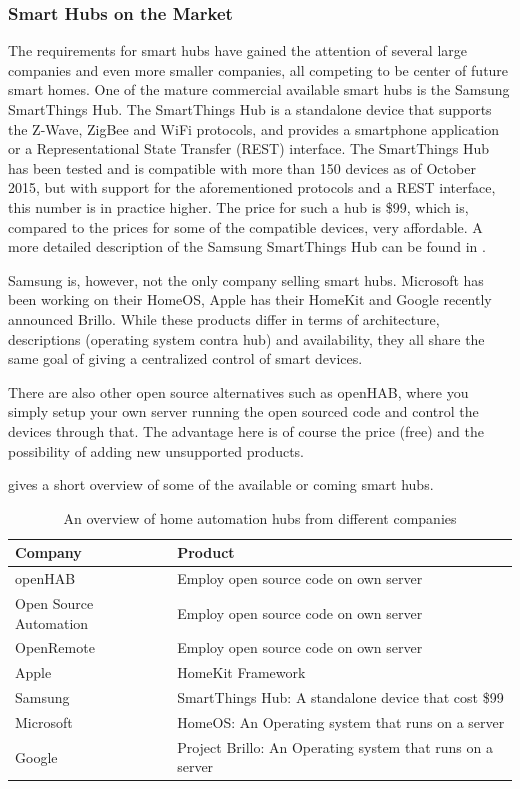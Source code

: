\subsubsection{Smart Hubs on the Market}
The requirements for smart hubs have gained the attention of several large companies and even more smaller companies, 
all competing to be center of future smart homes. 
One of the mature commercial available smart hubs is the Samsung SmartThings Hub\cite{SMARTTHINGS}. 
The SmartThings Hub is a standalone device that supports the Z-Wave, ZigBee and WiFi protocols, 
and provides a smartphone application or a Representational State Transfer (REST) interface. 
The SmartThings Hub has been tested and is compatible with more than 150 devices as of October 2015,
but with support for the aforementioned protocols and a REST interface, this number is in practice higher.  
The price for such a hub is \$99, which is, compared to the prices for some of the compatible devices, very affordable. 
A more detailed description of the Samsung SmartThings Hub can be found in . 

Samsung is, however, not the only company selling smart hubs. 
Microsoft has been working on their HomeOS\cite{HOMEOS}, Apple has their HomeKit\cite{HOMEKIT} and Google recently announced Brillo\cite{BRILLO}. 
While these products differ in terms of architecture, descriptions (operating system contra hub) and availability,
they all share the same goal of giving a centralized control of smart devices. 

There are also other open source alternatives such as openHAB\cite{OPENHAB}, 
where you simply setup your own server running the open sourced code and control the devices through that. 
The advantage here is of course the price (free) and the possibility of adding new unsupported products. 


 gives a short overview of some of the available or coming smart hubs. 
\begin{table}
    \centering
    \begin{tabular}{l l}
        Company                           & Product                              \\\hline
        openHAB\cite{OPENHAB}             & Employ open source code on own server \\
        Open Source Automation\cite{OSA}  & Employ open source code on own server \\
        OpenRemote\cite{OPENREMOTE}       & Employ open source code on own server \\
        Apple\cite{HOMEKIT}               & HomeKit Framework \\
        Samsung\cite{SMARTTHINGS}         & SmartThings Hub: A standalone device that cost \$99 \\
        Microsoft\cite{HOMEOS}            & HomeOS: An Operating system that runs on a server \\
        Google\cite{BRILLO}               & Project Brillo: An Operating system that runs on a server
    \end{tabular}
    \caption{An overview of home automation hubs from different companies}
    \label{table:smarthubs}
\end{table}

